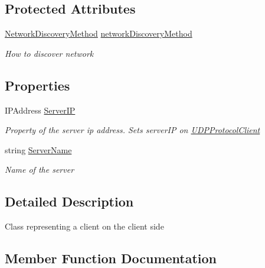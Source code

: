 \subsection*{Protected Attributes}
\begin{DoxyCompactItemize}
\item 
\mbox{\hyperlink{namespace_enhanced_dodo_server_ab7ed9134420741255e959334cdc5207a}{Network\+Discovery\+Method}} \mbox{\hyperlink{class_enhanced_dodo_server_1_1_client_a7856b104d7501399400d83dd789bc810}{network\+Discovery\+Method}}
\begin{DoxyCompactList}\small\item\em How to discover network \end{DoxyCompactList}\end{DoxyCompactItemize}
\subsection*{Properties}
\begin{DoxyCompactItemize}
\item 
I\+P\+Address \mbox{\hyperlink{class_enhanced_dodo_server_1_1_client_ab0401654a3ee99fab881203f2786ecf8}{Server\+IP}}
\begin{DoxyCompactList}\small\item\em Property of the server ip address. Sets server\+IP on \mbox{\hyperlink{class_enhanced_dodo_server_1_1_u_d_p_protocol_client}{U\+D\+P\+Protocol\+Client}} \end{DoxyCompactList}\item 
string \mbox{\hyperlink{class_enhanced_dodo_server_1_1_client_a4a278205ef0a67200187552f8024b31c}{Server\+Name}}
\begin{DoxyCompactList}\small\item\em Name of the server \end{DoxyCompactList}\end{DoxyCompactItemize}


\subsection{Detailed Description}
Class representing a client on the client side 



\subsection{Member Function Documentation}
\mbox{\label{class_enhanced_dodo_server_1_1_client_a47f19f54ab101e4d411f79930478d38b}} 
